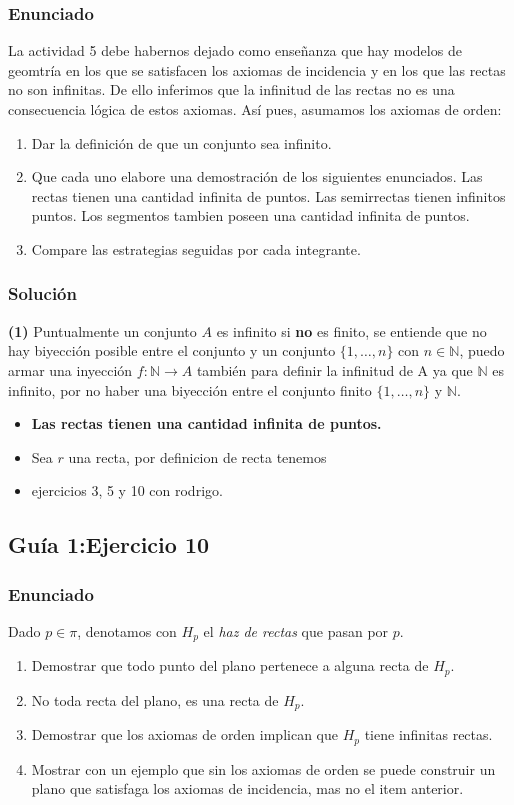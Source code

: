 \documentclass[a4paper]{article}
\begin{document}
\subsubsection{Enunciado}
La actividad 5 debe habernos dejado como enseñanza que hay modelos de geomtría en los que se satisfacen los axiomas de incidencia y en los que las rectas no son infinitas. De ello inferimos que la infinitud de las rectas no es una consecuencia lógica de estos axiomas. Así pues, asumamos los axiomas de orden:
\begin{enumerate}
    \item Dar la definición de que un conjunto sea infinito.
    \item Que cada uno elabore una demostración de los siguientes enunciados. Las rectas tienen una cantidad infinita de puntos. Las semirrectas tienen infinitos puntos. Los segmentos tambien poseen una cantidad infinita de puntos.
    \item Compare las estrategias seguidas por cada integrante.
\end{enumerate}
\subsubsection{Solución}
\textbf{(1)} Puntualmente un conjunto $A$ es infinito si \textbf{no} es finito, se entiende que no hay biyección posible entre el conjunto y un conjunto $\{1,\dots,n\}$ con $n\in \mathbb{N}$, puedo armar una inyección $f:\mathbb{N}\rightarrow A$ también para definir la infinitud de A ya que $\mathbb{N}$ es infinito, por no haber una biyección entre el conjunto finito $\{1,\dots, n\}$ y $\mathbb{N}$.
\begin{itemize}
    \item \textbf{Las rectas tienen una cantidad infinita de puntos.}
    \item Sea $r$ una recta,  por definicion de recta tenemos 
    \item ejercicios 3, 5 y 10 con rodrigo.
\end{itemize}
\subsection{Guía 1:Ejercicio 10}
\subsubsection{Enunciado}
Dado $p \in \pi$, denotamos con $H_p$ el \textit{haz de rectas} que pasan por $p$. 
\begin{enumerate}
    \item Demostrar que todo punto del plano pertenece a alguna recta de $H_p$.
    \item No toda recta del plano, es una recta de $H_p$.
    \item Demostrar que los axiomas de orden implican que $H_p$ tiene infinitas rectas.
    \item Mostrar con un ejemplo que sin los axiomas de orden se puede construir un plano que satisfaga los axiomas de incidencia, mas no el item anterior.
\end{enumerate}
\end{document}
